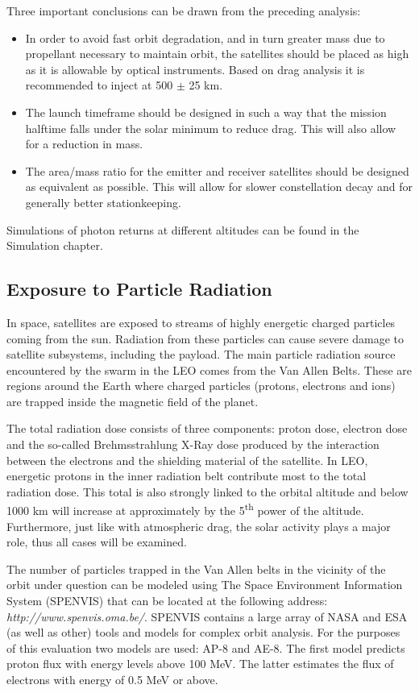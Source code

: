 Three important conclusions can be drawn from the preceding analysis:
\begin{itemize}
	\item In order to avoid fast orbit degradation, and in turn greater mass due to propellant necessary to maintain orbit, the satellites should be placed as high as it is allowable by optical instruments. Based on drag analysis it is recommended to inject at 500 $\pm$ 25 km.
	\item The launch timeframe should be designed in such a way that the mission halftime falls under the solar minimum to reduce drag. This will also allow for a reduction in mass.
	\item The area/mass ratio for the emitter and receiver satellites should be designed as equivalent as possible. This will allow for slower constellation decay and for generally better stationkeeping.  
\end{itemize}
  
Simulations of photon returns at different altitudes can be found in the Simulation chapter.

\subsection{Exposure to Particle Radiation}
\label{mtrRadiation}

In space, satellites are exposed to streams of highly energetic charged particles coming from the sun. Radiation from these particles can cause severe damage to satellite subsystems, including the payload. The main particle radiation source encountered by the swarm in the \ac{LEO} comes from the Van Allen Belts. These are regions around the Earth where charged particles (protons, electrons and ions) are trapped inside the magnetic field of the planet.

The total radiation dose consists of three components: proton dose, electron dose and the so-called Brehmsstrahlung X-Ray dose produced by the interaction between the electrons and the shielding material of the satellite. In \ac{LEO}, energetic protons in the inner radiation belt contribute most to the total radiation dose. This total is also strongly linked to the orbital altitude and below 1000 km will increase at approximately by the 5\textsuperscript{th} power of the altitude. Furthermore, just like with atmospheric drag, the solar activity plays a major role, thus all cases will be examined.

The number of particles trapped in the Van Allen belts in the vicinity of the orbit under question can be modeled using The Space Environment Information System (SPENVIS) that can be located at the following address: \emph{http://www.spenvis.oma.be/}. SPENVIS contains a large array of NASA and ESA (as well as other) tools and models for complex orbit analysis. For the purposes of this evaluation two models are used: AP-8 and AE-8. The first model predicts proton flux with energy levels above 100 MeV. The latter estimates the flux of electrons with energy of 0.5 MeV or above.

